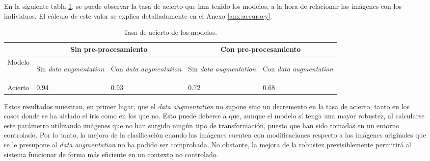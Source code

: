 En la siguiente tabla \ref{tabla:tasa-acierto-modelos}, se puede observar la tasa de acierto que han tenido los modelos, a la hora de relacionar las imágenes
 con los individuos. El cálculo de este valor se explica detalladamente en el Anexo \ref{anx:accuracy}.

\begin{table}[h!]
\begin{tabular}{ |p{1.2cm}||p{2.3cm}|p{2.3cm}|p{2.3cm}|p{2.3cm}|  }
    \hline
     & \multicolumn{2}{|c|}{Sin pre-procesamiento} & \multicolumn{2}{|c|}{Con pre-procesamiento} \\
    \hline
    Modelo& \begin{footnotesize}Sin \textit{data \newline augmentation}\end{footnotesize} & \begin{footnotesize}Con \textit{data \newline augmentation}\end{footnotesize} & \begin{footnotesize}Sin \textit{data \newline augmentation}\end{footnotesize}& \begin{footnotesize}Con \textit{data \newline augmentation}\end{footnotesize}\\
    \hline
    Acierto & 0.94   & 0.93    & 0.72 &   0.68\\
    \hline
   \end{tabular}
   \caption{\label{tabla:tasa-acierto-modelos}Tasa de acierto de los modelos.}
\end{table}


Estos resultados muestran, en primer lugar, que el \textit{data augmentation} no supone sino un decremento en la tasa de acierto, tanto en los casos donde se ha aislado el iris
como en los que no. Esto puede deberse a que, aunque el modelo sí tenga una mayor robustez, al calcularse este parámetro utilizando imágenes que no han surgido ningún tipo de transformación, puesto que han sido tomadas en un entorno controlado.
Por lo tanto, la mejora de la clasificación cuando las imágenes cuenten con modificaciones respecto a las imágenes originales que se le presupone al \textit{data augmentation} no ha podido ser comprobada. No obstante, la mejora de la robustez previsiblemente
permitirá al sistema funcionar de forma más eficiente en un contexto no controlado.

